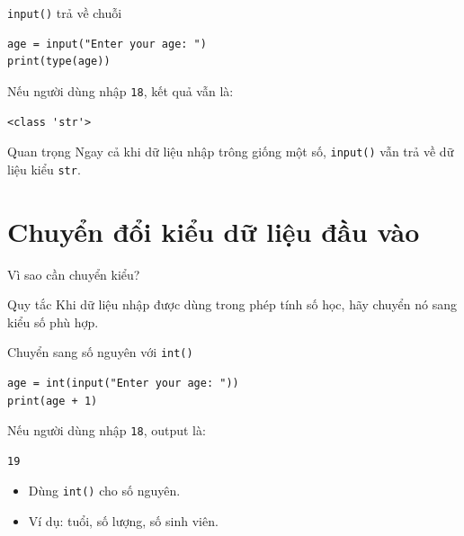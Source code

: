 \documentclass[aspectratio=169,10pt]{beamer}
\begin{document}
\begin{frame}[fragile]{\texttt{input()} trả về chuỗi}
\begin{lstlisting}
age = input("Enter your age: ")
print(type(age))
\end{lstlisting}
Nếu người dùng nhập \texttt{18}, kết quả vẫn là:
\begin{verbatim}
<class 'str'>
\end{verbatim}
\begin{alertblock}{Quan trọng}
Ngay cả khi dữ liệu nhập trông giống một số, \texttt{input()} vẫn trả về dữ liệu kiểu \texttt{str}.
\end{alertblock}
\end{frame}

\section{Chuyển đổi kiểu dữ liệu đầu vào}

\begin{frame}{Vì sao cần chuyển kiểu?}
\begin{center}
\end{center}
\vspace{0.35cm}
\begin{block}{Quy tắc}
Khi dữ liệu nhập được dùng trong phép tính số học, hãy chuyển nó sang kiểu số phù hợp.
\end{block}
\end{frame}

\begin{frame}[fragile]{Chuyển sang số nguyên với \texttt{int()}}
\begin{lstlisting}
age = int(input("Enter your age: "))
print(age + 1)
\end{lstlisting}
Nếu người dùng nhập \texttt{18}, output là:
\begin{verbatim}
19
\end{verbatim}
\begin{itemize}
  \item Dùng \texttt{int()} cho số nguyên.
  \item Ví dụ: tuổi, số lượng, số sinh viên.
\end{itemize}
\end{frame}
\end{document}
